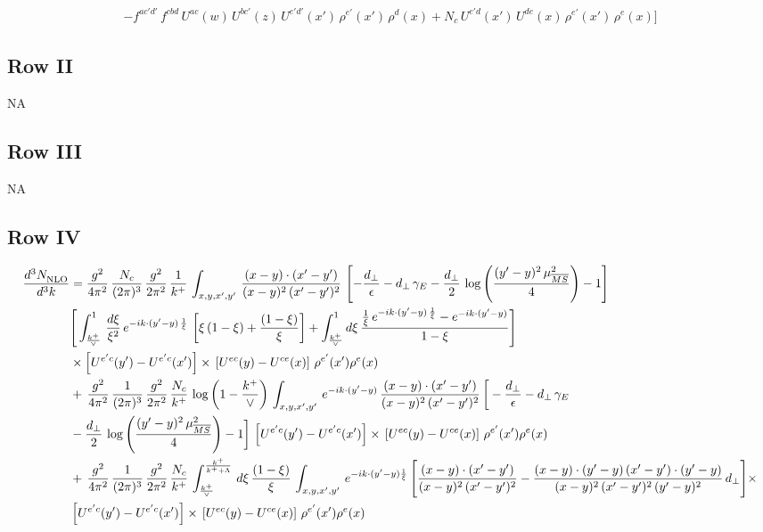 \documentclass[9pt]{article}
\numberwithin{equation}{section}
\begin{document}
\begin{align}
-f^{ac'd'}\,f^{cbd}\,U^{ac}(w)\,U^{bc'}(z)\,U^{e'd'}(x')\,\rho^{e'}(x')\,\rho^{d}(x) +N_{c}\,U^{e'd}(x')\,U^{de}(x)\,\rho^{e'}(x')\,\rho^{e}(x)\Bigg]
\end{align}
\subsection{Row II}
\textsc{NA}
\subsection{Row III}
\textsc{NA}
\subsection{Row IV}
\begin{align}
    \frac{d^{3}N_{\rm NLO}^{\rm}}{d^{3}k}  & = \frac{g^{2}}{4\pi^{2}}\, \frac{N_{c}}{(2\pi)^{3}}\,\frac{g^{2}}{2\pi^{2}}\, \frac{1}{k^{+}}\,\int_{x,y,x',y'}\,\frac{(x-y)\cdot (x'-y')}{(x-y)^{2}\,(x'-y')^{2}}\,\left[-\frac{d_{\perp}}{\epsilon}-d_{\perp}\,\gamma_{E}-\frac{d_{\perp}}{2}\,\log{\left(\frac{(y'-y)^{2}\,\mu^{2}_{\overline{MS}}}{4}\right)}-1\right]\,\notag \\ & \Bigg[\int_{\frac{k^{+}}{\vee}}^{1}\,\frac{d\xi}{\xi^{2}}\,e^{-ik\cdot (y'-y)\,\frac{1}{\xi}}\,\left[\xi\,(1-\xi)+\frac{(1-\xi)}{\xi}\right]+\int_{\frac{k^{+}}{\vee}}^{1}d\xi\,\frac{\frac{1}{\xi}\,e^{-ik\cdot (y'-y)\,\frac{1}{\xi}}-e^{-ik\cdot (y'-y)}}{1-\xi}\Bigg]\notag \\ & \times \left[U^{e'c}(y') - U^{e'c}(x')\right] \times\, \left[U^{ec}(y) - U^{ce}(x)\right]\, \rho^{e'}(x') \rho^{e}(x)\notag \\ &  +\, \frac{g^{2}}{4\pi^{2}}\, \frac{1}{(2\pi)^{3}}\,\frac{g^{2}}{2\pi^{2}}\, \frac{N_{c}}{k^{+}}\, \log{\left(1-\frac{k^{+}}{\vee}\right)}\,\int_{x,y,x',y'}\,e^{-ik\cdot (y'-y)}\,\frac{(x-y)\cdot (x'-y')}{(x-y)^{2}\,(x'-y')^{2}}\,\bigg[-\frac{d_{\perp}}{\epsilon}-d_{\perp}\,\gamma_{E}\notag \\ & -\frac{d_{\perp}}{2}\,\log{\left(\frac{(y'-y)^{2}\,\mu^{2}_{\overline{MS}}}{4}\right)}-1\bigg]\,\left[U^{e'c}(y') - U^{e'c}(x')\right] \times\, \left[U^{ec}(y) - U^{ce}(x)\right]\, \rho^{e'}(x') \rho^{e}(x)\notag \\ & +\,\frac{g^{2}}{4\pi^{2}}\, \frac{1}{(2\pi)^{3}}\,\frac{g^{2}}{2\pi^{2}}\, \frac{N_{c}}{k^{+}}\,\int_{\frac{k^{+}}{\vee}}^{\frac{k^{+}}{k^{+}+\Lambda}}\,d\xi\, \frac{(1-\xi)}{\xi}\, \int_{x,y,x',y'}\,e^{-ik\cdot (y'-y)\frac{1}{\xi}}\,\Bigg[\frac{(x-y)\cdot (x'-y')}{(x-y)^{2}\, (x'-y')^{2}} -\frac{(x-y)\cdot (y'-y)\, (x'-y')\cdot (y'-y)}{(x-y)^{2}\,(x'-y')^{2}\,(y'-y)^{2}}\,d_{\perp}\Bigg]\times\notag \\ &  \left[U^{e'c}(y') - U^{e'c}(x')\right] \times\, \left[U^{ec}(y) - U^{ce}(x)\right]\, \rho^{e'}(x') \rho^{e}(x)
\end{align}
\end{document}

